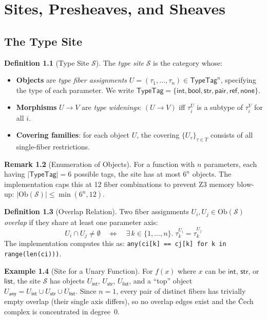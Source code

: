 \documentclass[11pt,a4paper]{report}
\theoremstyle{definition}
\newtheorem{definition}{Definition}[chapter]
\newtheorem{example}[definition]{Example}
\newtheorem{remark}[definition]{Remark}
\theoremstyle{plain}
\newcommand{\site}{\mathcal{S}}
\begin{document}
\chapter{Sites, Presheaves, and Sheaves}
\label{ch:sheaves}

\section{The Type Site}

\begin{definition}[Type Site $\site$]
\label{def:type-site}
The \emph{type site} $\site$ is the category whose:
\begin{itemize}
  \item \textbf{Objects} are \emph{type fiber assignments}
    $U = (\tau_1, \ldots, \tau_n) \in \mathsf{TypeTag}^n$, specifying
    the type of each parameter.  We write
    $\mathsf{TypeTag} = \{\mathsf{int}, \mathsf{bool}, \mathsf{str},
    \mathsf{pair}, \mathsf{ref}, \mathsf{none}\}$.
  \item \textbf{Morphisms} $U \to V$ are \emph{type widenings}:
    $(U \to V)$ iff $\tau_i^U$ is a subtype of $\tau_i^V$ for all $i$.
  \item \textbf{Covering families}: for each object $U$, the covering
    $\{U_\tau\}_{\tau \in T}$ consists of all single-fiber restrictions.
\end{itemize}
\end{definition}

\begin{remark}[Enumeration of Objects]
For a function with $n$ parameters, each having $|\mathsf{TypeTag}|= 6$
possible tags, the site has at most $6^n$ objects.  The implementation
caps this at 12 fiber combinations to prevent Z3 memory blow-up:
$|\mathrm{Ob}(\site)| \leq \min(6^n, 12)$.
\end{remark}

\begin{definition}[Overlap Relation]
\label{def:overlap}
Two fiber assignments $U_i, U_j \in \mathrm{Ob}(\site)$ \emph{overlap}
if they share at least one parameter axis:
\[
  U_i \cap U_j \neq \emptyset
  \quad\iff\quad
  \exists\, k \in \{1,\ldots,n\}.\; \tau_k^{U_i} = \tau_k^{U_j}
\]
The implementation computes this as:
\texttt{any(ci[k] == cj[k] for k in range(len(ci)))}.
\end{definition}

\begin{example}[Site for a Unary Function]
\label{ex:unary-site}
For $f(x)$ where $x$ can be $\mathsf{int}$, $\mathsf{str}$, or
$\mathsf{list}$, the site $\site$ has objects $U_\mathsf{int}$,
$U_\mathsf{str}$, $U_\mathsf{list}$, and a ``top'' object
$U_\mathsf{any} = U_\mathsf{int} \cup U_\mathsf{str} \cup
U_\mathsf{list}$.  Since $n=1$, every pair of distinct fibers has
trivially empty overlap (their single axis differs), so no overlap
edges exist and the \v{C}ech complex is concentrated in degree~0.
\end{example}
\end{document}

